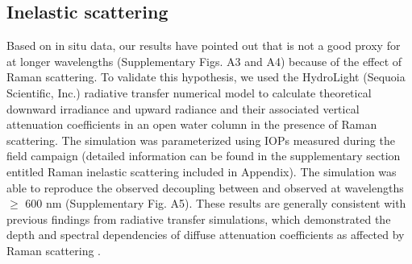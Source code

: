 \subsection{Inelastic scattering}

Based on in situ data, our results have pointed out that \klu{} is not a good proxy for \ked{} at longer wavelengths (Supplementary Figs. A3 and A4) because of the effect of Raman scattering. To validate this hypothesis, we used the HydroLight (Sequoia Scientific, Inc.) radiative transfer numerical model to calculate theoretical downward irradiance and upward radiance and their associated vertical attenuation coefficients in an open water column in the presence of Raman scattering. The simulation was parameterized using IOPs measured during the field campaign (detailed information can be found in the supplementary section entitled Raman inelastic scattering included in Appendix). The simulation was able to reproduce the observed decoupling between \ked{} and \klu{} observed at wavelengths $\ge$ 600 nm (Supplementary Fig. A5). These results are generally consistent with previous findings from radiative transfer simulations, which demonstrated the depth and spectral dependencies of diffuse attenuation coefficients as affected by Raman scattering \citep{Li2016, Berwald1998}.
